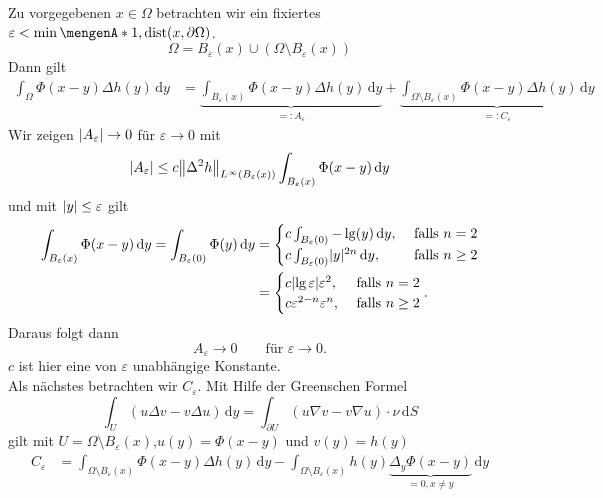 \begin{beweis}
	Zu vorgegebenen $x \in \Omega$ betrachten wir ein fixiertes $\varepsilon < \min \set{1,\dist(x, \partial \Omega)}$.
	\[
		\Omega = B_{\varepsilon}(x) \cup (\Omega \setminus B_{\varepsilon}(x))
	\]
	Dann gilt
	\begin{align*}
		\int_{\Omega}^{} \Phi(x-y) \Delta h(y) \,\mathrm{d}y 
		&= \underset{=:A_{\varepsilon}}{\underbrace{\int_{B_{\varepsilon}(x)}^{} \Phi(x-y) \Delta h(y) \,\mathrm{d}y }}
		+ \underset{=:C_{\varepsilon}}{\underbrace{\int_{ \Omega \setminus B _{\varepsilon}(x)}^{} \Phi(x-y) \Delta h(y) \,\mathrm{d}y}}
	\end{align*}
	Wir zeigen $\lvert A _{\varepsilon}\rvert\to 0$ für $\varepsilon \to 0$ mit
	\begin{equation}
		\abs{A_{\varepsilon}} \leq c \norm{\Delta^2 h}_{L^{\infty}(B_{\varepsilon}(x))} \int_{B_{\varepsilon}(x)}^{}\Phi(x-y) \,\mathrm{d}y
	\end{equation}
	und mit $\lvert y\rvert \leq \varepsilon$ gilt
	\begin{align}
		\int_{B_{\varepsilon}(x)}^{}\Phi(x-y) \,\mathrm{d}y = \int_{B_{\varepsilon}(0)}^{} \Phi(y) \,\mathrm{d}y &= \begin{cases}
			c \int_{B_{\varepsilon}(0)}^{} -\lg(y) \,\mathrm{d}y, &\text{ falls } n =2\\
			c \int_{B_{\varepsilon}(0)}^{} \lvert y\rvert^{2n} \,\mathrm{d}y , &\text{ falls } n \geq 2
			\end{cases} \\
			&= \begin{cases}
				c \lvert\lg \varepsilon\rvert \varepsilon^2, &\text{ falls }n=2\\
				c \varepsilon^{2-n} \varepsilon^n, &\text{ falls }n \geq 2\\
			\end{cases}.
	\end{align}
	Daraus folgt dann \[
		A_{\varepsilon} \to 0 \qquad \text{für }\varepsilon \to 0.
	\]
	$c$ ist hier eine von $\varepsilon$ unabhängige Konstante. \\
	Als nächstes betrachten wir $C_{\varepsilon}$. Mit Hilfe der Greenschen Formel 
	\[
		\int_{U}^{} ( u \Delta v - v \Delta u) \,\mathrm{d}y = \int_{\partial U}^{}(u  \nabla  v - v  \nabla u) \cdot \nu \,\mathrm{d}S
	\]
	gilt mit $U = \Omega \setminus B _{\varepsilon}(x)$,$u(y) = \Phi(x-y)$ und $v(y)= h(y)$
	\begin{align*}
		C _{\varepsilon} &= \int_{\Omega \setminus B _{\varepsilon}(x)}^{} \Phi(x-y) \Delta h(y)  \,\mathrm{d}y
		 - \int_{\Omega \setminus B _{\varepsilon}(x)}^{} h(y) \underset{=0, x \neq y}{\underbrace{\Delta_y \Phi(x-y)}} \,\mathrm{d}y \\

\end{align*}
\end{beweis}
